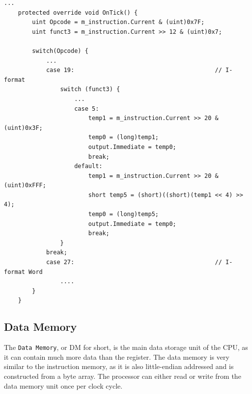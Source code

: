         \begin{minipage}{\linewidth}
            \begin{lstlisting}[language={[Sharp]C}, caption={A slice of the \texttt{IMMGEN} process SME code. We first extract the opcode and funct3 fields from the instruction and put them in a variable. We then use a \texttt{switch} statement and the opcode to determine what type of instruction we are dealing with. Since some instructions of same type like \texttt{slli} only use the lower 6 bits in the immediate field (shamt field), we need another switch statement to tell these apart using the funct3 field. Lastly we construct the immediate and output it . Note that in line 18 we make use of a little hack to retain the sign bit of a 12 bit number since it is not supported in \texttt{C\#}},captionpos=b, label = IMMGEN]
...
    protected override void OnTick() {
        uint Opcode = m_instruction.Current & (uint)0x7F;
        uint funct3 = m_instruction.Current >> 12 & (uint)0x7;
            
        switch(Opcode) {
            ...
            case 19:                                        // I-format
                switch (funct3) {
                    ...
                    case 5:
                        temp1 = m_instruction.Current >> 20 & (uint)0x3F;
                        temp0 = (long)temp1;
                        output.Immediate = temp0;
                        break;
                    default:
                        temp1 = m_instruction.Current >> 20 & (uint)0xFFF;
                        short temp5 = (short)((short)(temp1 << 4) >> 4);
                        temp0 = (long)temp5;
                        output.Immediate = temp0;
                        break;
                }
            break;
            case 27:                                        // I-format Word
                ....
        }
    }
            \end{lstlisting}
        \end{minipage} 
\newpage
    \subsection{Data Memory}
        The \texttt{Data Memory}, or DM for short, is the main data storage unit of the CPU, as it can contain much more data than the register. The data memory is very similar to the instruction memory, as it is also little-endian addressed and is constructed from a byte array. The processor can either read or write from the data memory unit once per clock cycle.
        
